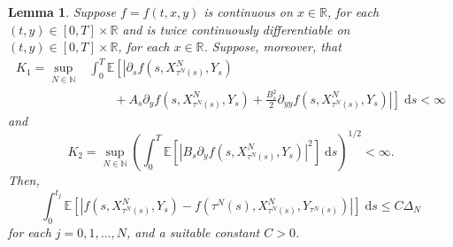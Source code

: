 \documentclass[reqno,12pt]{amsart}
\theoremstyle{plain}%
\newtheorem{lem}{Lemma}[section]
\theoremstyle{definition}
\begin{document}
\begin{lem}
    \label{lemestimatesforI1andI2}
    Suppose $f=f(t, x, y)$ is continuous on $x\in \mathbb{R}$, for each $(t, y)\in [0, T]\times \mathbb{R}$ and is twice continuously differentiable on $(t, y)\in [0, T]\times \mathbb{R}$, for each $x\in \mathbb{R}$. Suppose, moreover, that
    \begin{equation}
        \label{estimateforI1}
        \begin{aligned}
            K_1 = \sup_{N\in\mathbb{N}} & \int_0^{T} \mathbb{E}\left[\left|\partial_s f(s, X_{\tau^N(s)}^N, Y_s) \right.\right. \\ 
            & \qquad + A_s \partial_y f(s, X_{\tau^N(s)}^N, Y_s) + \frac{B_s^2}{2} \left.\left.\partial_{yy}f(s, X_{\tau^N(s)}^N, Y_s) \right|\right] \;\mathrm{d}s < \infty
        \end{aligned}
    \end{equation}
    and
    \begin{equation}
        \label{estimateforI2}
        K_2 = \sup_{N\in \mathbb{N}}\left(\int_0^T \mathbb{E}\left[\left|B_s \partial_y f(s, X_{\tau^N(s)}^N, Y_s)\right|^2\right] \;\mathrm{d}s\right)^{1/2} < \infty.
    \end{equation}
    Then,
    \begin{equation}
        \label{rewrittennoisetermbound}
        \int_0^{t_j} \mathbb{E}\left[\left| f(s, X_{\tau^N(s)}^N, Y_s) - f(\tau^N(s), X_{\tau^N(s)}^N, Y_{\tau^N(s)}) \right|\right]\;\mathrm{d}s \leq C\Delta_N
    \end{equation}
    for each $j = 0, 1, \ldots, N$, and a suitable constant $C>0$.
\end{lem}
\end{document}
